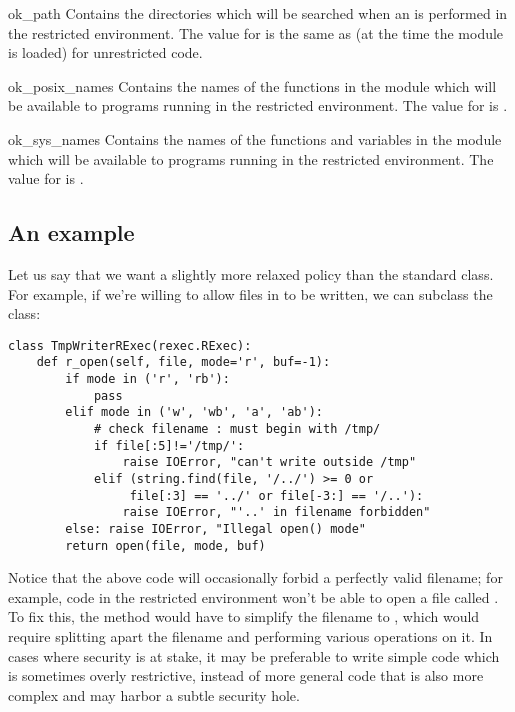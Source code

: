 \begin{memberdesc}{ok_path}
Contains the directories which will be searched when an 
is performed in the restricted environment.  
The value for  is the same as  (at the time
the module is loaded) for unrestricted code.
\end{memberdesc}

\begin{memberdesc}{ok_posix_names}
Contains the names of the functions in the  module which will be
available to programs running in the restricted environment.  The
value for  is .
\end{memberdesc}

\begin{memberdesc}{ok_sys_names}
Contains the names of the functions and variables in the 
module which will be available to programs running in the restricted
environment.  The value for  is .
\end{memberdesc}


\subsection{An example}

Let us say that we want a slightly more relaxed policy than the
standard  class.  For example, if we're willing to allow
files in  to be written, we can subclass the 
class:

\begin{verbatim}
class TmpWriterRExec(rexec.RExec):
    def r_open(self, file, mode='r', buf=-1):
        if mode in ('r', 'rb'):
            pass
        elif mode in ('w', 'wb', 'a', 'ab'):
            # check filename : must begin with /tmp/
            if file[:5]!='/tmp/': 
                raise IOError, "can't write outside /tmp"
            elif (string.find(file, '/../') >= 0 or
                 file[:3] == '../' or file[-3:] == '/..'):
                raise IOError, "'..' in filename forbidden"
        else: raise IOError, "Illegal open() mode"
        return open(file, mode, buf)
\end{verbatim}
%
Notice that the above code will occasionally forbid a perfectly valid
filename; for example, code in the restricted environment won't be
able to open a file called .  To fix this, the
 method would have to simplify the filename to
, which would require splitting apart the filename and
performing various operations on it.  In cases where security is at
stake, it may be preferable to write simple code which is sometimes
overly restrictive, instead of more general code that is also more
complex and may harbor a subtle security hole.
